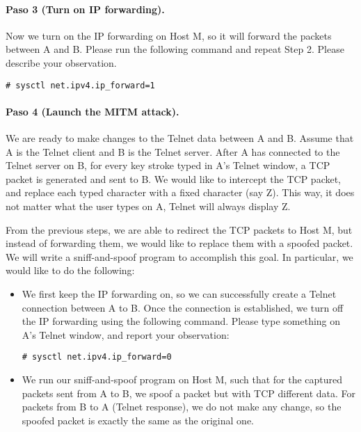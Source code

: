 \paragraph{Paso 3 (Turn on IP forwarding).} Now we turn on the IP forwarding on Host M, so it
will forward the packets between A and B. Please run the following command and repeat Step 2.
Please describe your observation. 

\begin{lstlisting}
# sysctl net.ipv4.ip_forward=1
\end{lstlisting}

\paragraph{Paso 4 (Launch the MITM attack).} We are ready to make changes to the Telnet data
between A and B. Assume that A is the Telnet client and B is the Telnet server. After A has
connected to the Telnet server on B, for every key stroke typed in A's Telnet window, a TCP
packet is generated and sent to B. We would like to intercept the TCP packet, and replace each
typed character with a fixed character (say Z). This way, it does not matter what the user
types on A, Telnet will always display Z.

From the previous steps, we are able to redirect the TCP packets to Host M, but instead of
forwarding them, we would like to replace them with a spoofed packet. We will write a
sniff-and-spoof program to accomplish this goal. In particular, we would like to do the
following: 

\begin{itemize}

\item We first keep the IP forwarding on, so we can successfully create a Telnet connection
between A to B. Once the connection is established, we turn off the IP forwarding using the
following command. Please type something on A's Telnet window, and report your observation: 

\begin{lstlisting}
# sysctl net.ipv4.ip_forward=0
\end{lstlisting}

\item We run our sniff-and-spoof program on Host M, such that for the captured packets sent
from A to B,  we spoof a packet but with TCP different data. For packets from B to A (Telnet
response), we do not make any change, so the spoofed packet is exactly the same as the original
one. 
\end{itemize} 

